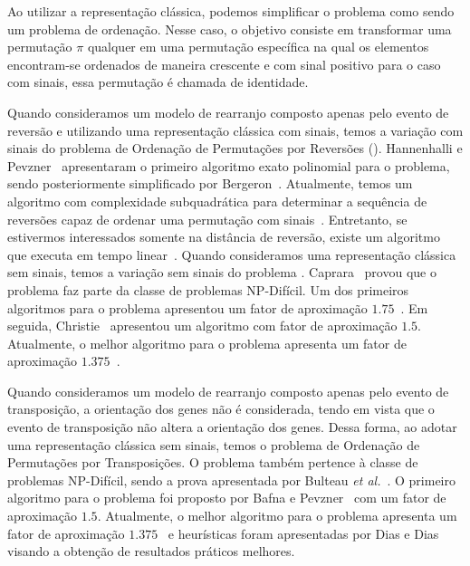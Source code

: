 Ao utilizar a representação clássica, podemos simplificar o problema como sendo um problema de ordenação. Nesse caso, o objetivo consiste em transformar uma permutação $\pi$ qualquer em uma permutação específica na qual os elementos encontram-se ordenados de maneira crescente e com sinal positivo para o caso com sinais, essa permutação é chamada de identidade.

Quando consideramos um modelo de rearranjo composto apenas pelo evento de reversão e utilizando uma representação clássica com sinais, temos a variação com sinais do problema de Ordenação de Permutações por Reversões (\SbR). Hannenhalli e Pevzner~\cite{1999-hannenhalli-pevzner} apresentaram o primeiro algoritmo exato polinomial para o problema, sendo posteriormente simplificado por Bergeron~\cite{2005-bergeron}. Atualmente, temos um algoritmo com complexidade subquadrática para determinar a sequência de reversões capaz de ordenar uma permutação com sinais~\cite{2007-tannier-etal}. Entretanto, se estivermos interessados somente na distância de reversão, existe um algoritmo que executa em tempo linear~\cite{2001-bader-etal}. Quando consideramos uma representação clássica sem sinais, temos a variação sem sinais do problema \SbR. Caprara~\cite{1999-caprara} provou que o problema faz parte da classe de problemas NP-Difícil. Um dos primeiros algoritmos para o problema apresentou um fator de aproximação $1.75$~\cite{1996-bafna-pevzner}. Em seguida, Christie~\cite{1998a-christie} apresentou um algoritmo com fator de aproximação $1.5$. Atualmente, o melhor algoritmo para o problema apresenta um fator de aproximação $1.375$~\cite{2002-berman-etal}.

Quando consideramos um modelo de rearranjo composto apenas pelo evento de transposição, a orientação dos genes não é considerada, tendo em vista que o evento de transposição não altera a orientação dos genes. Dessa forma, ao adotar uma representação clássica sem sinais, temos o problema de Ordenação de Permutações por Transposições. O problema também pertence à classe de problemas NP-Difícil, sendo a prova apresentada por Bulteau \textit{et al.}~\cite{2012-bulteau-etal}. O primeiro algoritmo para o problema foi proposto por Bafna e Pevzner~\cite{1998-bafna-pevzner} com um fator de aproximação $1.5$. Atualmente, o melhor algoritmo para o problema apresenta um fator de aproximação $1.375$~\cite{2006-elias-hartman,2022-silva-etal} e heurísticas foram apresentadas por Dias e Dias~\cite{2010c-dias-dias} visando a obtenção de resultados práticos melhores. 

